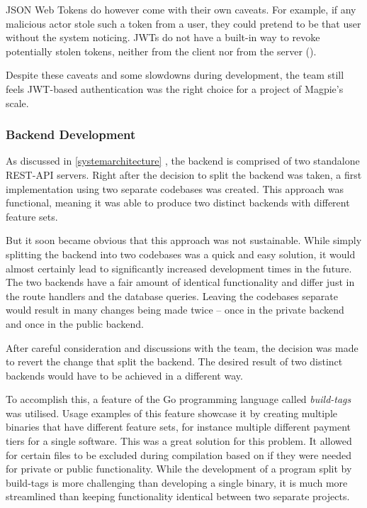 JSON Web Tokens do however come with their own caveats. For example, if any
malicious actor stole such a token from a user, they could pretend to be that
user without the system noticing. JWTs do not have a built-in way to revoke
potentially stolen tokens, neither from the client nor from the server
(\cite{owasp_jwt_cheatsheet}).

Despite these caveats and some slowdowns during development, the team still
feels JWT-based authentication was the right choice for a project of Magpie's
scale.

\subsubsection{Backend Development}
As discussed in \ref{systemarchitecture} , the
backend is comprised of two standalone REST-API servers. Right after the
decision to split the backend was taken, a first implementation using two
separate codebases was created. This approach was functional, meaning it was
able to produce two distinct backends with different feature sets.

But it soon became obvious that this approach was not sustainable. While simply
splitting the backend into two codebases was a quick and easy solution, it would
almost certainly lead to significantly increased development times in the
future. The two backends have a fair amount of identical functionality and
differ just in the route handlers and the database queries. Leaving the
codebases separate would result in many changes being made twice -- once in the
private backend and once in the public backend.

After careful consideration and discussions with the team, the decision was made
to revert the change that split the backend. The desired result of two distinct
backends would have to be achieved in a different way.

To accomplish this, a feature of the Go programming language called
\textit{build-tags} was utilised. Usage examples of this feature showcase it by
creating multiple binaries that have different feature sets, for instance
multiple different payment tiers for a single software. This was a great
solution for this problem. It allowed for certain files to be excluded during
compilation based on if they were needed for private or public functionality.
While the development of a program split by build-tags is more challenging
than developing a single binary, it is much more streamlined than keeping
functionality identical between two separate projects.


